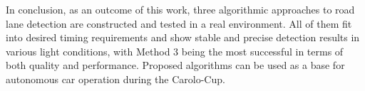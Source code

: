 In conclusion, as an outcome of this work, three algorithmic approaches to road lane detection are constructed and tested in a real environment. All of them fit into desired timing requirements and show stable and precise detection results in various light conditions, with Method 3 being the most successful in terms of both quality and performance. Proposed algorithms can be used as a base for autonomous car operation during the Carolo-Cup.